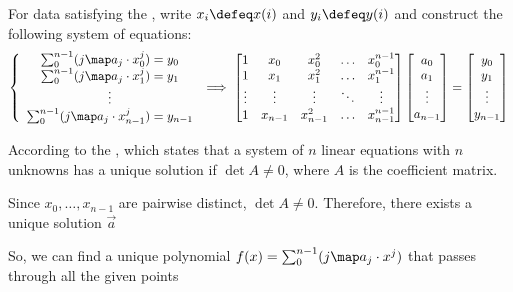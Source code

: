 \documentclass[12pt]{article}
\numberwithin{figure}{section}
\begin{document}

\begin{conv}
    For data satisfying the , write $x_i\defeq x(i)$ and $y_i\defeq y(i)$ and construct the following system of equations:
    \begin{align*}
        \left\{
        \begin{array}{c}
            \sum_0^{n-1}(j\map a_j\cdot x_0^j)=y_0 \\
            \sum_0^{n-1}(j\map a_j\cdot x_1^j)=y_1 \\
            \vdots \\
            \sum_0^{n-1}(j\map a_j\cdot x_{n-1}^j)=y_{n-1}
        \end{array} \implies 
        \begin{bmatrix}
            1 & x_0 & x_0^2 & \ldots & x_0^{n-1} \\
            1 & x_1 & x_1^2 & \ldots & x_1^{n-1} \\
            \vdots & \vdots & \vdots & \ddots & \vdots \\
            1 & x_{n-1} & x_{n-1}^2 & \ldots & x_{n-1}^{n-1}
        \end{bmatrix}
        \begin{bmatrix}
            a_0 \\
            a_1 \\
            \vdots \\
            a_{n-1}
        \end{bmatrix}
        =
        \begin{bmatrix}
            y_0 \\
            y_1 \\
            \vdots \\
            y_{n-1}
        \end{bmatrix} 
        \right. 
    \end{align*}

    According to the \color{purple}{Theorem in Linear Algebra} \color{black}, which states that a system of $n$ linear equations with $n$ unknowns has a unique solution if $\det{A} \neq 0$, where $A$ is the coefficient matrix. 

    Since $x_0,\ldots,x_{n-1}$ are pairwise distinct, $\det{A}\ne0$. Therefore, there exists a unique solution $\vec a$

    So, we can find a unique polynomial $f(x)=\sum_0^{n-1}(j\map a_j\cdot x^j)$ that passes through all the given points
\end{conv}
\end{document}
